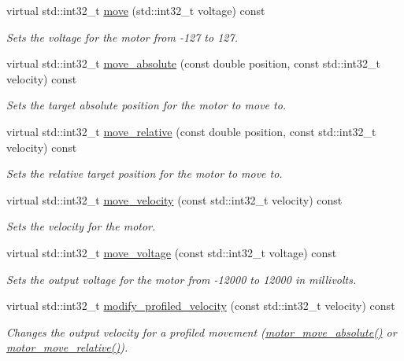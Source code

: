 \begin{DoxyCompactItemize}
virtual std\+::int32\+\_\+t \hyperlink{classpros_1_1Motor_a7ea9aedd4e12844be2584dc3f4b7a4bf}{move} (std\+::int32\+\_\+t voltage) const
\begin{DoxyCompactList}\small\item\em Sets the voltage for the motor from -\/127 to 127. \end{DoxyCompactList}\item 
virtual std\+::int32\+\_\+t \hyperlink{classpros_1_1Motor_a7851ffa40c9803d75398a5be355de395}{move\+\_\+absolute} (const double position, const std\+::int32\+\_\+t velocity) const
\begin{DoxyCompactList}\small\item\em Sets the target absolute position for the motor to move to. \end{DoxyCompactList}\item 
virtual std\+::int32\+\_\+t \hyperlink{classpros_1_1Motor_a96c09e169b5135d9001cec92fa2686c1}{move\+\_\+relative} (const double position, const std\+::int32\+\_\+t velocity) const
\begin{DoxyCompactList}\small\item\em Sets the relative target position for the motor to move to. \end{DoxyCompactList}\item 
virtual std\+::int32\+\_\+t \hyperlink{classpros_1_1Motor_a797de937c2d550c3fa199806db07dbcc}{move\+\_\+velocity} (const std\+::int32\+\_\+t velocity) const
\begin{DoxyCompactList}\small\item\em Sets the velocity for the motor. \end{DoxyCompactList}\item 
virtual std\+::int32\+\_\+t \hyperlink{classpros_1_1Motor_a3c79db57c20617fbbc49461c58612cfb}{move\+\_\+voltage} (const std\+::int32\+\_\+t voltage) const
\begin{DoxyCompactList}\small\item\em Sets the output voltage for the motor from -\/12000 to 12000 in millivolts. \end{DoxyCompactList}\item 
virtual std\+::int32\+\_\+t \hyperlink{classpros_1_1Motor_a44f39232cec1caee6d668d8ff21dc28b}{modify\+\_\+profiled\+\_\+velocity} (const std\+::int32\+\_\+t velocity) const
\begin{DoxyCompactList}\small\item\em Changes the output velocity for a profiled movement (\hyperlink{motors_8h_ab70bf4937f1b5cefa15c11c15314c90e}{motor\+\_\+move\+\_\+absolute()} or \hyperlink{motors_8h_ab4c1ba35d69e8e9b49df0e848fa305d3}{motor\+\_\+move\+\_\+relative()}). \end{DoxyCompactList}\item 

\end{DoxyCompactItemize}
